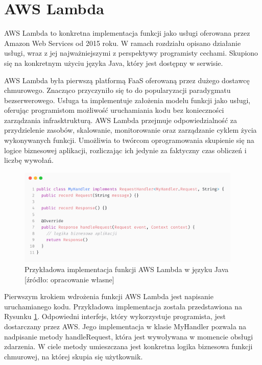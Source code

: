 \section{AWS Lambda}\label{chapter:aws_lambda}

AWS Lambda to konkretna implementacja funkcji jako usługi oferowana przez Amazon Web Services od 2015 roku.
W ramach rozdziału opisano działanie usługi, wraz z jej najważniejszymi z perspektywy programisty cechami.
Skupiono się na konkretnym użyciu języka Java, który jest dostępny w serwisie.

AWS Lambda była pierwszą platformą FaaS oferowaną przez dużego dostawcę chmurowego.
Znacząco przyczyniło się to do popularyzacji paradygmatu bezserwerowego.
Usługa ta implementuje założenia modelu funkcji jako usługi, oferując programistom możliwość uruchamiania kodu bez konieczności zarządzania infrasktrukturą.
AWS Lambda przejmuje odpowiedzialność za przydzielenie zasobów, skalowanie, monitorowanie oraz zarządzanie cyklem życia wykonywanych funkcji.
Umożliwia to twórcom oprogramowania skupienie się na logice biznesowej aplikacji, rozliczając ich jedynie za faktyczny czas obliczeń i liczbę wywołań.

\begin{figure}[h]
    \centering
    \includegraphics[width=0.95\textwidth]{charts/sample-lambda-code.png}
    \caption{Przykładowa implementacja funkcji AWS Lambda w języku Java [źródło: opracowanie własne]}
    \label{fig:example_aws_lambda}
\end{figure}

Pierwszym krokiem wdrożenia funkcji AWS Lambda jest napisanie uruchamianego kodu.
Przykładowa implementacja została przedstawiona na Rysunku \ref{fig:example_aws_lambda}. 
Odpowiedni interfejs, który wykorzystuje programista, jest dostarczany przez AWS.
Jego implementacja w klasie MyHandler pozwala na nadpisanie metody handleRequest, która jest wywoływana w momencie obsługi zdarzenia.
W ciele metody umieszczana jest konkretna logika biznesowa funkcji chmurowej, na której skupia się użytkownik.


